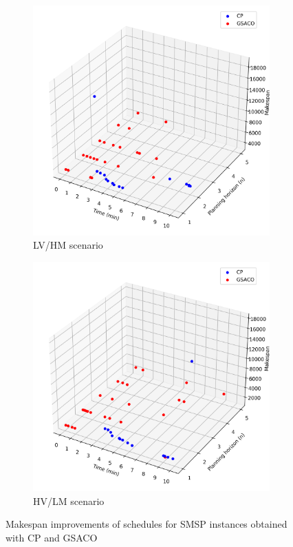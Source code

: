 \begin{figure}[t]
	\centering
	\begin{subfigure}[b]{0.45\linewidth}
		\includegraphics[width=\textwidth]{LVHM.png}
		\caption{LV/HM scenario}
		\label{subfig:l}
	\end{subfigure}
	\hfill
	\begin{subfigure}[b]{0.45\linewidth}
		\includegraphics[width=\textwidth]{HVLM.png}
		\caption{HV/LM scenario}
		\label{subfig:h}
	\end{subfigure}
	\caption{Makespan improvements of schedules for SMSP instances obtained with CP and GSACO \cite{Ali2024}\label{fig:makespan}}
\end{figure}


